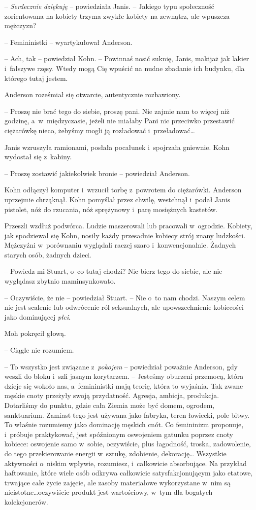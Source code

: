 \documentclass[oneside,polish,11pt,sfheadings]{mwbk}
\begin{document}
-- \emph{Serdecznie dziękuję} -- powiedziała Janis. -- Jakiego typu
społeczność zorientowana na kobiety trzyma zwykłe kobiety na zewnątrz,
ale wpuszcza mężczyzn?

-- Femininistki -- wyartykułował Anderson.

-- Ach, tak -- powiedział Kohn. -- Powinnaś nosić suknię, Janis, makijaż
jak lakier i~fałszywe rzęsy. Wtedy mogą Cię wpuścić na nudne zbadanie
ich budynku, dla którego tutaj jestem.

Anderson roześmiał się otwarcie, autentycznie rozbawiony.

-- Proszę nie brać tego do siebie, proszę pani. Nie zajmie nam to więcej
niż godzinę, a~w~międzyczasie, jeżeli nie miałaby Pani nic przeciwko
przestawić ciężarówkę nieco, żebyśmy mogli ją rozładować i~przeładować\ldots

Janis wzruszyła ramionami, posłała pocałunek i~spojrzała gniewnie. Kohn
wydostał się z~kabiny.

-- Proszę zostawić jakiekolwiek bronie -- powiedział Anderson.

Kohn odłączył komputer i~wrzucił torbę z~powrotem do ciężarówki.
Anderson uprzejmie chrząknął. Kohn pomyślał przez chwilę, westchnął i~podał Janis pistolet, nóż do rzucania, nóż sprężynowy i~parę mosiężnych
kastetów.

Przeszli wzdłuż podwórca. Ludzie maszerowali lub pracowali w~ogrodzie.
Kobiety, jak spodziewał się Kohn, nosiły każdy przesadnie kobiecy strój
znany ludzkości. Mężczyźni w~porównaniu wyglądali raczej szaro i~konwencjonalnie. Żadnych starych osób, żadnych dzieci.

-- Powiedz mi Stuart, o~co tutaj chodzi? Nie bierz tego do siebie, ale
nie wyglądasz zbytnio maminsynkowato.

-- Oczywiście, że nie -- powiedział Stuart. -- Nie o~to nam chodzi. Naszym
celem nie jest scalenie lub odwrócenie ról seksualnych, ale
upowszechnienie kobiecości jako dominującej \emph{płci}.

Moh pokręcił głową. 

-- Ciągle nie rozumiem.

-- To wszystko jest związane z~\emph{pokojem} -- powiedział poważnie
Anderson, gdy weszli do bloku i~szli jasnym korytarzem. -- Jesteśmy
oburzeni przemocą, która dzieje się wokoło nas, a~femininistki mają
teorię, która to wyjaśnia. Tak zwane męskie cnoty przeżyły swoją
przydatność. Agresja, ambicja, produkcja. Dotarliśmy do punktu, gdzie
cała Ziemia może być domem, ogrodem, sanktuarium. Zamiast tego jest
używana jako fabryka, teren łowiecki, pole bitwy. To właśnie rozumiemy
jako dominację męskich cnót. Co femininizm proponuje, i~próbuje
praktykować, jest spóźnionym oswojeniem gatunku poprzez cnoty kobiece:
oswojenie samo w~sobie, oczywiście, plus łagodność, troska, zadowolenie,
do tego przekierowanie energii w~sztukę, zdobienie, dekorację\ldots
Wszystkie aktywności o~niskim wpływie, rozumiesz, i~całkowicie
absorbujące. Na przykład haftowanie, które wiele osób odkrywa całkowicie
satysfakcjonującym jako etatowe, trwające całe życie zajęcie, ale zasoby
materiałowe wykorzystane w~nim są nieistotne\ldots oczywiście produkt jest
wartościowy, w~tym dla bogatych kolekcjonerów.
\end{document}
